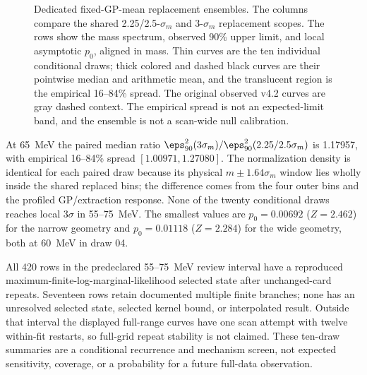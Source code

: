 \begin{figure}[H]
\centering
{}
\caption{Dedicated fixed-GP-mean replacement ensembles.  The columns compare
the shared 2.25/2.5-$\sigma_m$ and 3-$\sigma_m$ replacement scopes.  The rows
show the mass spectrum, observed 90\% \CLs{} upper limit, and local
asymptotic $p_0$, aligned in mass.  Thin curves are the ten individual
conditional draws; thick colored and dashed black curves are their pointwise
median and arithmetic mean, and the translucent region is the empirical
16--84\% spread.  The original observed v4.2 curves are gray dashed context.
The empirical spread is not an expected-limit band, and the ensemble is not
a scan-wide null calibration.}
\label{fig:appendix-v4p2-gp-window-ensemble}
\end{figure}

At 65~MeV the paired median ratio
$\eps^2_{90}(3\sigma_m)/\eps^2_{90}(2.25/2.5\sigma_m)$ is 1.17957, with
empirical 16--84\% spread $[1.00971,1.27080]$.  The normalization density is
identical for each paired draw because its physical
$m\pm1.64\sigma_m$ window lies wholly inside the shared replaced bins; the
difference comes from the four outer bins and the profiled GP/extraction
response.  None of the twenty conditional draws reaches local $3\sigma$ in
55--75~MeV.  The smallest values are $p_0=0.00692$ ($Z=2.462$) for the
narrow geometry and $p_0=0.01118$ ($Z=2.284$) for the wide geometry, both at
60~MeV in draw 04.

All 420 rows in the predeclared 55--75~MeV review interval have a reproduced
maximum-finite-log-marginal-likelihood selected state after unchanged-card
repeats.  Seventeen rows retain documented multiple finite branches; none has
an unresolved selected state, selected kernel bound, or interpolated result.
Outside that interval the displayed full-range curves have one scan attempt
with twelve within-fit restarts, so full-grid repeat stability is not claimed.
These ten-draw summaries are a conditional recurrence and mechanism screen,
not expected sensitivity, coverage, or a probability for a future full-data
observation.
